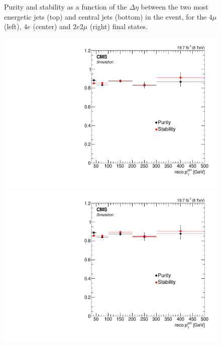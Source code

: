 \begin{figure}[hbtp]
\begin{center}
 \caption{Purity and stability as a function of the $\Delta\eta$ between the two most energetic jets (top) and  central jets (bottom) in the event,  for the $4\mu$ (left), $4e$ (center) and $2e2\mu$ (right) final states.}
    \label{fig:ps_deta}
  \end{center}
\end{figure}

\begin{figure}[hbtp]
  \begin{center}
    \includegraphics[width=0.8\cmsFigWidth]{Figures/Unfolding/BinMigration/PurityStability_4m_PtJet1_Mad}
    \includegraphics[width=0.8\cmsFigWidth]{Figures/Unfolding/BinMigration/PurityStability_4e_PtJet1_Mad}

\end{center}
\end{figure}
